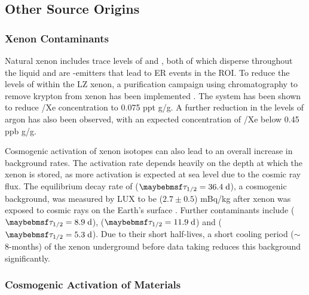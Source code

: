 \subsection{Other Source Origins}
\label{subsec:other_bkkg_sources}

\subsubsection{Xenon Contaminants}

Natural xenon includes trace levels of \KrEF{} and \ArTN{}, both of which disperse throughout the liquid and are \beta{}-emitters that lead to ER events in the ROI. To reduce the levels of \KrEF{} within the LZ xenon, a purification campaign using chromatography to remove krypton from xenon has been implemented \cite{lz_tdr}. The system has been shown to reduce \KrNAT{}/Xe concentration to 0.075 ppt g/g. A further reduction in the levels of argon has also been observed, with an expected concentration of \ArNAT{}/Xe below 0.45 ppb g/g.

Cosmogenic activation of xenon isotopes can also lead to an overall increase in  background rates. The activation rate depends heavily on the depth at which the xenon is stored, as more activation is expected at sea level due to the cosmic ray flux. The equilibrium decay rate of \XeOTSeven{} ($\tau_{1/2} = 36.4 \; \MathText{d}$), a cosmogenic background, was measured by LUX to be ($2.7 \pm 0.5$) mBq/kg after xenon was exposed to cosmic rays on the Earth’s surface \cite{radiogenic_muon_lux}. Further contaminants include \XeOTNm{} ($\tau_{1/2} = 8.9 \; \MathText{d}$), \XeOTOm{} ($\tau_{1/2} = 11.9 \; \MathText{d}$) and \XeOTT{} ($\tau_{1/2} = 5.3 \; \MathText{d}$). Due to their short half-lives, a short cooling period ($\sim$8-months) of the xenon underground before data taking reduces this background significantly. 


\subsubsection{Cosmogenic Activation of Materials}

